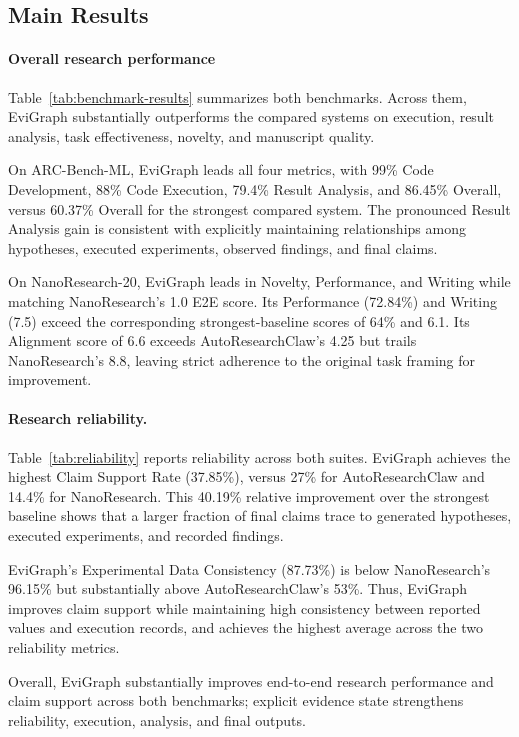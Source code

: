 \documentclass[letterpaper]{article} %
\begin{document}
\subsection{Main Results}
\label{sec:results}

\paragraph{Overall research performance}
Table~\ref{tab:benchmark-results} summarizes both benchmarks. Across them, EviGraph substantially outperforms the compared systems on execution, result analysis, task effectiveness, novelty, and manuscript quality.

On ARC-Bench-ML, EviGraph leads all four metrics, with 99\% Code Development, 88\% Code Execution, 79.4\% Result Analysis, and 86.45\% Overall, versus 60.37\% Overall for the strongest compared system. The pronounced Result Analysis gain is consistent with explicitly maintaining relationships among hypotheses, executed experiments, observed findings, and final claims.

On NanoResearch-20, EviGraph leads in Novelty, Performance, and Writing while matching NanoResearch's 1.0 E2E score. Its Performance (72.84\%) and Writing (7.5) exceed the corresponding strongest-baseline scores of 64\% and 6.1. Its Alignment score of 6.6 exceeds AutoResearchClaw's 4.25 but trails NanoResearch's 8.8, leaving strict adherence to the original task framing for improvement.



\paragraph{Research reliability.}
Table~\ref{tab:reliability} reports reliability across both suites. EviGraph achieves the highest Claim Support Rate (37.85\%), versus 27\% for AutoResearchClaw and 14.4\% for NanoResearch. This 40.19\% relative improvement over the strongest baseline shows that a larger fraction of final claims trace to generated hypotheses, executed experiments, and recorded findings.

EviGraph's Experimental Data Consistency (87.73\%) is below NanoResearch's 96.15\% but substantially above AutoResearchClaw's 53\%. Thus, EviGraph improves claim support while maintaining high consistency between reported values and execution records, and achieves the highest average across the two reliability metrics.

Overall, EviGraph substantially improves end-to-end research performance and claim support across both benchmarks; explicit evidence state strengthens reliability, execution, analysis, and final outputs.
\end{document}
